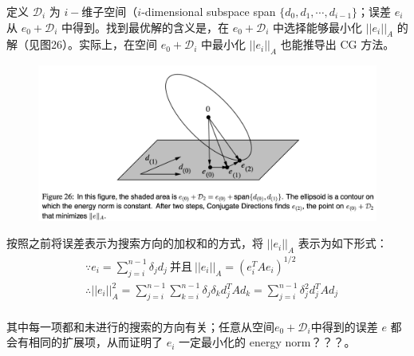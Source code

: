 \documentclass[12pt]{article}
\begin{document}
定义 $\mathcal{D}_i$ 为 $i-$维子空间（$i$-dimensional subspace span $\{d_0, d_1, \cdots, d_{i-1}\}$；误差 $e_i$ 从 $e_0 + \mathcal{D}_i$ 中得到。找到最优解的含义是，在 $e_0 + \mathcal{D}_i$ 中选择能够最小化 $||e_i||_A$ 的解（见图26）。实际上，在空间 $e_0 + \mathcal{D}_i$ 中最小化  $||e_i||_A$ 也能推导出 CG 方法。
\begin{figure}[H]
    \centering
    \includegraphics[width=1\textwidth]{fig/CG_Convergence_CD_5.png}
\end{figure}

按照之前将误差表示为搜索方向的加权和的方式，将 $||e_i||_A$ 表示为如下形式：
\begin{align*}
& \because e_i = \sum_{j=i}^{n-1}\delta_jd_j  \  \text{并且} \ ||e_i||_A = (e_i^TAe_i)^{1/2} \\
&\therefore ||e_i||^2_A = \sum_{j=i}^{n-1}\sum_{k=i}^{n-1}\delta_j\delta_kd^T_jAd_k = \sum_{j=i}^{n-1}\delta_j^2d^T_jAd_j\\
\end{align*}

其中每一项都和未进行的搜索的方向有关；任意从空间$e_0 + \mathcal{D}_i$中得到的误差 $e$ 都会有相同的扩展项，从而证明了 $e_i$ 一定最小化的 energy norm？？？。
\end{document}
